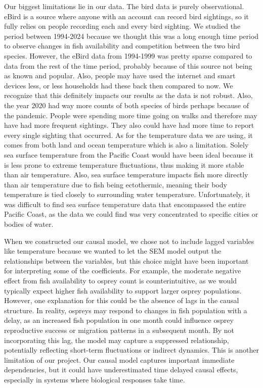 \documentclass{article}
\begin{document}
Our biggest limitations lie in our data. The bird data is purely observational. eBird is a source where anyone with an account can record bird sightings, so it fully relies on people recording each and every bird sighting. We studied the period between 1994-2024 because we thought this was a long enough time period to observe changes in fish availability and competition between the two bird species. However, the eBird data from 1994-1999 was pretty sparse compared to data from the rest of the time period, probably because of this source not being as known and popular. Also, people may have used the internet and smart devices less, or less households had these back then compared to now. We recognize that this definitely impacts our results as the data is not robust. Also, the year 2020 had way more counts of both species of birds perhaps because of the pandemic. People were spending more time going on walks and therefore may have had more frequent sightings. They also could have had more time to report every single sighting that occurred. As for the temperature data we are using, it comes from both land and ocean temperature which is also a limitation. Solely sea surface temperature from the Pacific Coast would have been ideal because it is less prone to extreme temperature fluctuations, thus making it more stable than air temperature. Also, sea surface temperature impacts fish more directly than air temperature due to fish being ectothermic, meaning their body temperature is tied closely to surrounding water temperature. Unfortunately, it was difficult to find sea surface temperature data that encompassed the entire Pacific Coast, as the data we could find was very concentrated to specific cities or bodies of water. 

When we constructed our causal model, we chose not to include lagged variables like temperature because we wanted to let the SEM model output the relationships between the variables, but this choice might have been important for interpreting some of the coefficients. For example, the moderate negative effect from fish availability to osprey count is counterintuitive, as we would typically expect higher fish availability to support larger osprey populations. However, one explanation for this could be the absence of lags in the causal structure. In reality, ospreys may respond to changes in fish population with a delay, as an increased fish population in one month could influence osprey reproductive success or migration patterns in a subsequent month. By not incorporating this lag, the model may capture a suppressed relationship, potentially reflecting short-term fluctuations or indirect dynamics. This is another limitation of our project. Our causal model captures important immediate dependencies, but it could have underestimated time delayed causal effects, especially in systems where biological responses take time. 
\end{document}
